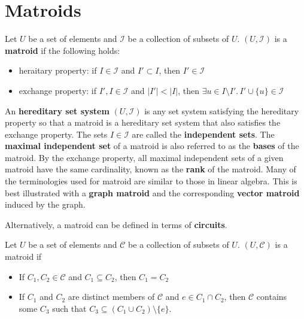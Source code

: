 \section{Matroids}

\begin{definition}[Matroid]
    Let $U$ be a set of elements and $\mathcal{I}$ be a collection of subsets of $U$. $(U,\mathcal{I})$ is a \textbf{matroid} if the following holds:
    \begin{itemize}
        \item heraitary property: if $I \in \mathcal{I}$ and $I' \subset I$, then $I' \in \mathcal{I}$
        \item exchange property: if $I',I \in \mathcal{I}$ and $|I'| < |I|$, then $\exists u \in I \setminus I'.\, I' \cup \{u\} \in \mathcal{I}$  
    \end{itemize}
\end{definition}

An \textbf{hereditary set system} $(U,\mathcal{I})$ is any set system satisfying the hereditary property so that a matroid is a hereditary set system that also satisfies the exchange property. The sets $I \in \mathcal{I}$ are called the \textbf{independent sets}. The \textbf{maximal independent set} of a matroid is also referred to as the \textbf{bases} of the matroid. By the exchange property, all maximal independent sets of a given matroid have the same cardinality, known as the \textbf{rank} of the matroid. Many of the terminologies used for matroid are similar to those in linear algebra. This is best illustrated with a \textbf{graph matroid} and the corresponding \textbf{vector matroid} induced by the graph.

Alternatively, a matroid can be defined in terms of \textbf{circuits}.

\begin{definition}
    Let $U$ be a set of elements and $\mathcal{C}$ be a collection of subsets of $U$. $(U,\mathcal{C})$ is a matroid if
    \begin{itemize}
        \item If $C_1,C_2 \in \mathcal{C}$ and $C_1 \subseteq C_2$, then $C_1 = C_2$
        \item If $C_1$ and $C_2$ are distinct members of $\mathcal{C}$ and $e \in C_1 \cap C_2$, then $\mathcal{C}$ contains some $C_3$ such that $C_3 \subseteq (C_1 \cup C_2) \setminus \{e\}$.
    \end{itemize}
\end{definition}

